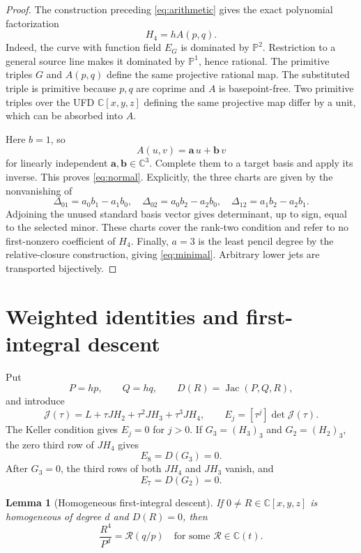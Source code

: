 \documentclass[11pt]{article}
\newtheorem{lemma}[theorem]{Lemma}
\theoremstyle{remark}
\newcommand{\C}{\mathbb C}
\newcommand{\PP}{\mathbb P}
\newcommand{\Jac}{\operatorname{Jac}}
\begin{document}
\begin{proof}
The construction preceding \eqref{eq:arithmetic} gives the exact polynomial
factorization
\[
 H_4=hA(p,q).
\]
Indeed, the curve with function field $E_G$ is dominated by $\PP^2$.
Restriction to a general source line makes it dominated by $\PP^1$, hence
rational.  The primitive triples $G$ and $A(p,q)$ define the same
projective rational map.  The substituted triple is primitive because
$p,q$ are coprime and $A$ is basepoint-free.  Two primitive triples over
the UFD $\C[x,y,z]$ defining the same projective map differ by a unit,
which can be absorbed into $A$.

Here $b=1$, so
\[
 A(u,v)=\mathbf a\,u+\mathbf b\,v
\]
for linearly independent $\mathbf a,\mathbf b\in\C^3$.  Complete them to a
target basis and apply its inverse.  This proves \eqref{eq:normal}.
Explicitly, the three charts are given by the nonvanishing of
\[
 \Delta_{01}=a_0b_1-a_1b_0,\quad
 \Delta_{02}=a_0b_2-a_2b_0,\quad
 \Delta_{12}=a_1b_2-a_2b_1.
\]
Adjoining the unused standard basis vector gives determinant, up to sign,
equal to the selected minor.  These charts cover the rank-two condition and
refer to no first-nonzero coefficient of $H_4$.  Finally, $a=3$ is the
least pencil degree by the relative-closure construction, giving
\eqref{eq:minimal}.  Arbitrary lower jets are transported bijectively.
\end{proof}

\section{Weighted identities and first-integral descent}

Put
\[
 P=hp,\qquad Q=hq,\qquad D(R)=\Jac(P,Q,R),
\]
and introduce
\[
 \mathcal J(\tau)=L+\tau JH_2+\tau^2JH_3+\tau^3JH_4,\qquad
 E_j=[\tau^j]\det\mathcal J(\tau).
\]
The Keller condition gives $E_j=0$ for $j>0$.  If
$G_3=(H_3)_3$ and $G_2=(H_2)_3$, the zero third row of $JH_4$ gives
\begin{equation}
 E_8=D(G_3)=0.                                       \label{eq:E8}
\end{equation}
After $G_3=0$, the third rows of both $JH_4$ and $JH_3$ vanish, and
\begin{equation}
 E_7=D(G_2)=0.                                       \label{eq:E7zero}
\end{equation}

\begin{lemma}[Homogeneous first-integral descent]\label{lem:descent}
If $0\ne R\in\C[x,y,z]$ is homogeneous of degree $d$ and $D(R)=0$, then
\begin{equation}
 \frac{R^4}{P^d}=\mathcal R(q/p)
 \quad\text{for some }\mathcal R\in\C(t).             \label{eq:descent}
\end{equation}
\end{lemma}
\end{document}
